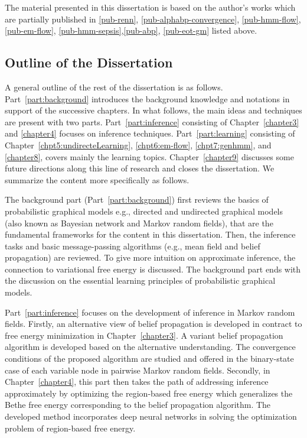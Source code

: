 The material presented in this dissertation is based on the author's works which are partially published in \ref{pub-renn}, \ref{pub-alphabp-convergence}, \ref{pub-hmm-flow}, \ref{pub-em-flow}, \ref{pub-hmm-sepsis},\ref{pub-abp}, \ref{pub-eot-gm} listed above.
\subsection{Outline of the Dissertation}

A general outline of the rest of the dissertation is as follows. Part~\ref{part:background} introduces the background knowledge and notations in support of the successive chapters. In what follows, the main ideas and techniques are present with two parts. Part~\ref{part:inference} consisting of Chapter~\ref{chapter3} and \ref{chapter4} focuses on inference techniques. Part~\ref{part:learning} consisting of Chapter~\ref{chpt5:undirecteLearning}, \ref{chpt6:em-flow}, \ref{chpt7:genhmm}, and \ref{chapter8}, covers mainly the learning topics. Chapter~\ref{chapter9} discusses some future directions along this line of research and closes the dissertation. We summarize the content more specifically as follows.

The background part (Part~\ref{part:background}) first reviews the basics of probabilistic graphical models e.g., directed and undirected graphical models (also known as Bayesian network and Markov random fields), that are the fundamental frameworks for the content in this dissertation. Then, the inference tasks and basic message-passing algorithms (e.g., mean field and belief propagation) are reviewed. To give more intuition on approximate inference, the connection to variational free energy is discussed. The background part ends with the discussion on the essential learning principles of probabilistic graphical models.

Part~\ref{part:inference} focuses on the development of inference in Markov random fields. Firstly, an alternative view of belief propagation is developed in contract to free energy minimization in Chapter~\ref{chapter3}. A variant belief propagation algorithm is developed based on the alternative understanding. The convergence conditions of the proposed algorithm are studied and offered in the binary-state case of each variable node in pairwise Markov random fields. Secondly, in Chapter~\ref{chapter4}, this part then takes the path of addressing inference approximately by optimizing the region-based free energy which generalizes the Bethe free energy corresponding to the belief propagation algorithm. The developed method incorporates deep neural networks in solving the optimization problem of region-based free energy.

